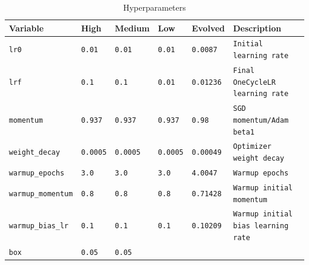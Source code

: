\label{Table Hyperparameters}
\begin{table}
    \caption{Hyperparameters}
    \centering
    \begin{tabular}{ | m{7.5em} | m{4em} | m{4em} | 
 m{4em}| m{4em} | m{16em} |} 
        \hline
            \centering\textbf{Variable} & 
            \centering\textbf{High} & 
            \centering\textbf{Medium} & 
            \centering\textbf{Low} & 
            \centering\textbf{Evolved} &
            \centering\textbf{Description}
            \tabularnewline
        \hline
            \texttt{lr0} & 
            \centering\texttt{0.01} & 
            \centering\texttt{0.01} & 
            \centering\texttt{0.01} & 
            \centering\texttt{0.0087} &
            \texttt{Initial learning rate}
            \tabularnewline
        \hline
            \texttt{lrf} & 
            \centering\texttt{0.1} & 
            \centering\texttt{0.1} & 
            \centering\texttt{0.01} & 
            \centering\texttt{0.01236} &
            \texttt{Final OneCycleLR learning rate}
            \tabularnewline
        \hline
            \texttt{momentum} & 
            \centering\texttt{0.937} & 
            \centering\texttt{0.937} & 
            \centering\texttt{0.937} & 
            \centering\texttt{0.98} &
            \texttt{SGD momentum/Adam beta1}
            \tabularnewline
        \hline
            \texttt{weight\_decay} & 
            \centering\texttt{0.0005} & 
            \centering\texttt{0.0005} & 
            \centering\texttt{0.0005} & 
            \centering\texttt{0.00049} &
            \texttt{Optimizer weight decay}
            \tabularnewline
        \hline
            \texttt{warmup\_epochs} & 
            \centering\texttt{3.0} & 
            \centering\texttt{3.0} & 
            \centering\texttt{3.0} & 
            \centering\texttt{4.0047} &
            \texttt{Warmup epochs}
            \tabularnewline
        \hline
            \texttt{warmup\_momentum} & 
            \centering\texttt{0.8} & 
            \centering\texttt{0.8} & 
            \centering\texttt{0.8} & 
            \centering\texttt{0.71428} &
            \texttt{Warmup initial momentum}
            \tabularnewline
        \hline
            \texttt{warmup\_bias\_lr} & 
            \centering\texttt{0.1} & 
            \centering\texttt{0.1} & 
            \centering\texttt{0.1} & 
            \centering\texttt{0.10209} &
            \texttt{Warmup initial bias learning rate}
            \tabularnewline
        \hline
            \texttt{box} & 
            \centering\texttt{0.05} & 
            \centering\texttt{0.05} & 

\end{tabular}
\end{table}
